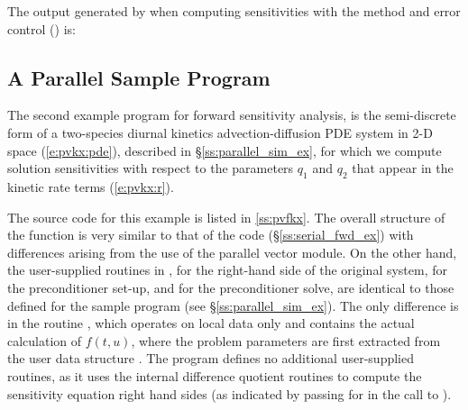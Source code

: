 The output generated by  when computing sensitivities with the 
method and  error control () is:
{\small}


\subsection{A Parallel Sample Program}\label{ss:parallel_fwd_ex}

The second example program for forward sensitivity analysis,  is the
semi-discrete form of a two-species diurnal kinetics advection-diffusion PDE 
system in 2-D space (\ref{e:pvkx:pde}), described in \S\ref{ss:parallel_sim_ex}, 
for which we compute solution sensitivities with respect to the parameters $q_1$ 
and $q_2$ that appear in the kinetic rate terms (\ref{e:pvkx:r}).

The source code for this example is listed in \A\ref{ss:pvfkx}.
The overall structure of the  function is very
similar to that of the code  (\S\ref{ss:serial_fwd_ex}) with 
differences arising from the use of the parallel vector module.
On the other hand, the user-supplied routines in ,
 for the right-hand side of the original system,
 for the preconditioner set-up, and  for the
preconditioner solve, are identical to those defined for the sample program
 (see \S\ref{ss:parallel_sim_ex}). The only difference is in the
routine , which operates on local data only and contains the actual 
calculation of $f(t,u)$, where the problem parameters are first extracted from
the user data structure . The program  defines no additional
user-supplied routines, as it uses the {\cvodes} internal difference quotient routines 
to compute the sensitivity equation right hand sides (as indicated by passing
 for  in the call to ).

